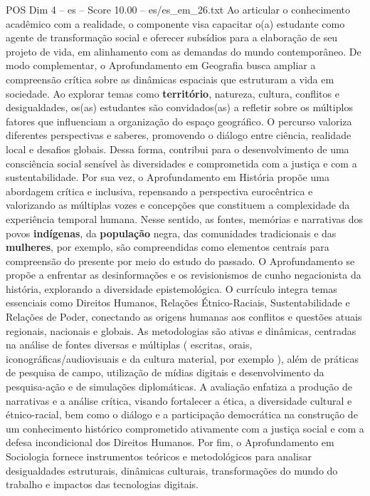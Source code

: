 \begin{textsample}{POS Dim 4 – es – Score 10.00 – es/es\_em\_26.txt}
Ao articular o conhecimento acadêmico com a realidade, o componente visa capacitar o(a) estudante como agente de transformação social e oferecer subsídios para a elaboração de seu projeto de vida, em alinhamento com as demandas do mundo contemporâneo.
De modo complementar, o Aprofundamento em Geografia busca ampliar a compreensão crítica sobre as dinâmicas espaciais que estruturam a vida em sociedade.
Ao explorar temas como \textbf{território}, natureza, cultura, conflitos e desigualdades, os(as) estudantes são convidados(as) a refletir sobre os múltiplos fatores que influenciam a organização do espaço geográfico.
O percurso valoriza diferentes perspectivas e saberes, promovendo o diálogo entre ciência, realidade local e desafios globais.
Dessa forma, contribui para o desenvolvimento de uma consciência social sensível às diversidades e comprometida com a justiça e com a sustentabilidade.
Por sua vez, o Aprofundamento em História propõe uma abordagem crítica e inclusiva, repensando a perspectiva eurocêntrica e valorizando as múltiplas vozes e concepções que constituem a complexidade da experiência temporal humana.
Nesse sentido, as fontes, memórias e narrativas dos povos \textbf{indígenas}, da \textbf{população} negra, das comunidades tradicionais e das \textbf{mulheres}, por exemplo, são compreendidas como elementos centrais para compreensão do presente por meio do estudo do passado.
O Aprofundamento se propõe a enfrentar as desinformações e os revisionismos de cunho negacionista da história, explorando a diversidade epistemológica.
O currículo integra temas essenciais como Direitos Humanos, Relações Étnico-Raciais, Sustentabilidade e Relações de Poder, conectando as origens humanas aos conflitos e questões atuais regionais, nacionais e globais.
As metodologias são ativas e dinâmicas, centradas na análise de fontes diversas e múltiplas ( escritas, orais, iconográficas/audiovisuais e da cultura material, por exemplo ), além de práticas de pesquisa de campo, utilização de mídias digitais e desenvolvimento da pesquisa-ação e de simulações diplomáticas.
A avaliação enfatiza a produção de narrativas e a análise crítica, visando fortalecer a ética, a diversidade cultural e étnico-racial, bem como o diálogo e a participação democrática na construção de um conhecimento histórico comprometido ativamente com a justiça social e com a defesa incondicional dos Direitos Humanos.
Por fim, o Aprofundamento em Sociologia fornece instrumentos teóricos e metodológicos para analisar desigualdades estruturais, dinâmicas culturais, transformações do mundo do trabalho e impactos das tecnologias digitais.

\end{textsample}
